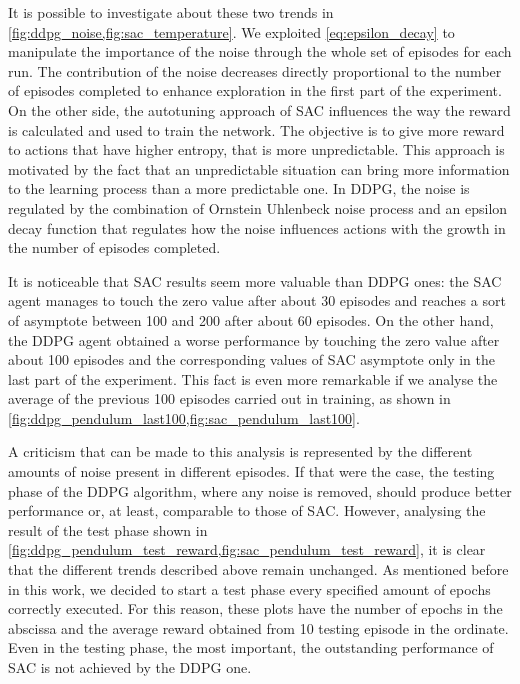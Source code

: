 It is possible to investigate about these two trends in \vref{fig:ddpg_noise,fig:sac_temperature}.
We exploited \vref{eq:epsilon_decay} to manipulate the importance of the noise through the whole set of episodes for each run.
The contribution of the noise decreases directly proportional to the number of episodes completed to enhance exploration in the first part of the experiment.
On the other side, the autotuning approach of SAC influences the way the reward is calculated and used to train the network.
The objective is to give more reward to actions that have higher entropy, that is more unpredictable.
This approach is motivated by the fact that an unpredictable situation can bring more information to the learning process than a more predictable one.
In DDPG, the noise is regulated by the combination of Ornstein Uhlenbeck noise process and an epsilon decay function that regulates how the noise influences actions with the growth in the number of episodes completed.

It is noticeable that SAC results seem more valuable than DDPG ones: the SAC agent manages to touch the zero value after about 30 episodes and reaches a sort of asymptote between 100 and 200 after about 60 episodes.
On the other hand, the DDPG agent obtained a worse performance by touching the zero value after about 100 episodes and the corresponding values of SAC asymptote only in the last part of the experiment.
This fact is even more remarkable if we analyse the average of the previous 100 episodes carried out in training, as shown in \vref{fig:ddpg_pendulum_last100,fig:sac_pendulum_last100}.

A criticism that can be made to this analysis is represented by the different amounts of noise present in different episodes.
If that were the case, the testing phase of the DDPG algorithm, where any noise is removed, should produce better performance or, at least, comparable to those of SAC.
However, analysing the result of the test phase shown in \vref{fig:ddpg_pendulum_test_reward,fig:sac_pendulum_test_reward}, it is clear that the different trends described above remain unchanged.
As mentioned before in this work, we decided to start a test phase every specified amount of epochs correctly executed.
For this reason, these plots have the number of epochs in the abscissa and the average reward obtained from 10 testing episode in the ordinate.
Even in the testing phase, the most important, the outstanding performance of SAC is not achieved by the DDPG one.

